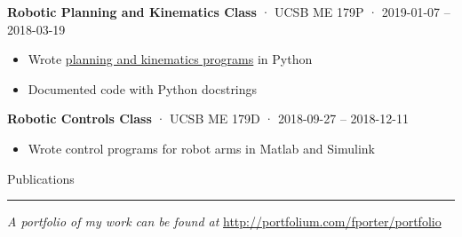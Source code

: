 \documentclass[12pt, oneside]{article}
\newcommand{\headingstyleJobs}[1] {
	{\fontsize{19pt}{1em}\selectfont \textcolor{new_red}{\textsf{#1}}}
	\textcolor{new_red}{\rule{3.25in}{0.5pt}} \vspace{3pt}
}
\newcommand{\jobtitle}[3] {
	{\bf #1} · {#2} · {#3} \vspace{-7pt} \\
}
\begin{document}
\begin{flushleft}
\jobtitle{Robotic Planning and Kinematics Class}{UCSB ME 179P}{2019-01-07 – 2018-03-19}
\begin{itemize}
	\item Wrote \href{https://github.com/fpdotmonkey/ME179P}{planning and kinematics programs} in Python
	\item Documented code with Python docstrings
\end{itemize}

\jobtitle{Robotic Controls Class}{UCSB ME 179D}{2018-09-27 – 2018-12-11}
\begin{itemize}
	\item Wrote control programs for robot arms in Matlab and Simulink
\end{itemize}






\headingstyleJobs{Publications}

\vspace{-9pt}
\nocite{OWMS}




\textit{A portfolio of my work can be found at} \url{http://portfolium.com/fporter/portfolio}

\end{flushleft}
\end{document}

